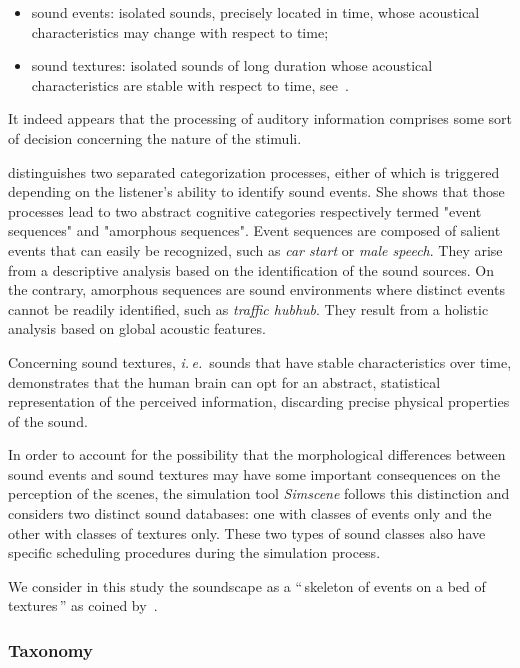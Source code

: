 \documentclass[12pt]{elsarticle}
\newcommand{\ie}{\emph{i.\,e.}}
\begin{document}
\begin{itemize}
\item {sound events}: isolated sounds, precisely located in time, whose acoustical characteristics may change with respect to time;
\item {sound textures}: isolated sounds of long duration whose acoustical characteristics are stable with respect to time, see~\cite{saint1995classification}.
\end{itemize}

It indeed appears that the processing of auditory information comprises some sort of decision concerning the nature of the stimuli.

\cite{maffiolo_caracterisation_1999} distinguishes two separated categorization processes, either of which is triggered depending on the listener's ability to identify sound events. She shows that those processes lead to two abstract cognitive categories respectively termed "event sequences" and "amorphous sequences". Event sequences are composed of salient events that can easily be recognized, such as \emph{car start} or \emph{male speech}. They arise from a descriptive analysis based on the identification of the sound sources. On the contrary, amorphous sequences are sound environments where distinct events cannot be readily identified, such as \emph{traffic hubhub}. They result from a holistic analysis based on global acoustic features.

Concerning sound textures, \ie~sounds that have stable characteristics over time, \cite{mcdermott2011sound,mcdermott2013summary} demonstrates that the human brain can opt for an abstract, statistical representation of the perceived information, discarding precise physical properties of the sound.

In order to account for the possibility that the morphological differences between sound events and sound textures may have some important consequences on the perception of the scenes, the simulation tool \emph{Simscene} follows this distinction and considers two distinct sound databases: one with classes of events only and the other with classes of textures only. These two types of sound classes also have specific scheduling procedures during the simulation process.

We consider in this study the soundscape as a ``\,skeleton of events on a bed of textures\,'' as coined by~\cite{nelken2013ear}.

\subsubsection*{Taxonomy}
\end{document}
